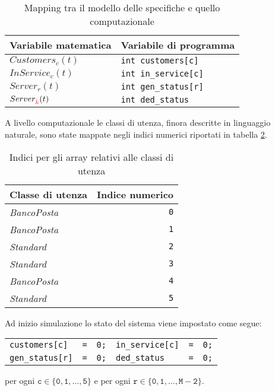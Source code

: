 \begin{table}[ht]
\centering
{\tablecolors
\begin{tabular}{| l | l |}
\hline
Variabile matematica & Variabile di programma \\
\hline
$Customers_c(t)$ & \texttt{{\color{code_purple}int} customers[c]} \\
\hline
$InService_c(t)$ & \texttt{{\color{code_purple}int} in\_service[c]} \\
\hline
$Server_r(t)$ & \texttt{{\color{code_purple}int} gen\_status[r]} \\
\hline
$Server_{\color{red}\hat{k}}(t)$ & \texttt{{\color{code_purple}int} ded\_status} \\
\hline
\end{tabular}}
\caption{Mapping tra il modello delle specifiche e quello computazionale}
\label{table:modello-computazionale-1}
\end{table}
\newpage
A livello computazionale le classi di utenza, finora descritte in linguaggio naturale, sono state mappate negli indici numerici riportati in tabella \ref{table:modello-computazionale-2}.
\begin{table}[ht]
\centering
{\tablecolors
\begin{tabular}{| l | r |}
\hline
Classe di utenza & Indice numerico \\
\hline
\uo{} \textsl{BancoPosta} & \texttt{0} \\
\hline
\pp{} \textsl{BancoPosta} & \texttt{1} \\
\hline
\uo{} \textsl{Standard} & \texttt{2} \\
\hline
\pp{} \textsl{Standard} & \texttt{3} \\
\hline
\sr{} \textsl{BancoPosta} & \texttt{4} \\
\hline
\sr{} \textsl{Standard} & \texttt{5} \\
\hline
\end{tabular}}
\caption{Indici per gli array relativi alle classi di utenza}
\label{table:modello-computazionale-2}
\end{table}

Ad inizio simulazione lo stato del sistema viene impostato come segue:
\begin{center}
\begin{tabular}{l l l l l l}
\texttt{customers[c]} & \texttt{=} & \texttt{0;} & \texttt{in\_service[c]} & \texttt{=} & \texttt{0;} \\
\texttt{gen\_status[r]} & \texttt{=} & \texttt{0;} & \texttt{ded\_status} & \texttt{=} & \texttt{0;}
\end{tabular}
\end{center}
per ogni $\mathtt{c\in \lbrace 0, 1, \dots, 5 \rbrace}$ e per ogni $\mathtt{r\in \lbrace 0, 1, \dots, M-2 \rbrace}$.

